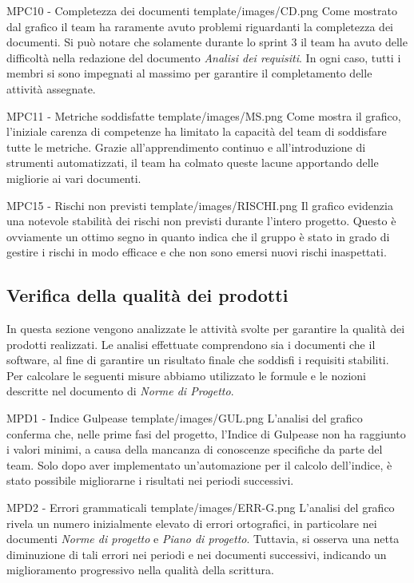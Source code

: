 \Met
{ %
    MPC10 - Completezza dei documenti
}
{ %
    template/images/CD.png
}
{ %
    Come mostrato dal grafico il team ha raramente avuto problemi riguardanti la completezza dei documenti.
    Si può notare che solamente durante lo sprint 3 il team ha avuto delle difficoltà nella redazione del documento \textit{Analisi dei requisiti}.
    In ogni caso, tutti i membri si sono impegnati al massimo per garantire il completamento delle attività assegnate.
}

\Met
{ %
    MPC11 - Metriche soddisfatte
}
{ %
    template/images/MS.png
}
{ %
    Come mostra il grafico, l'iniziale carenza di competenze ha limitato la capacità del team di soddisfare tutte le metriche.
    Grazie all'apprendimento continuo e all'introduzione di strumenti automatizzati, il team ha colmato queste lacune apportando delle migliorie ai vari documenti.
}

\Met
{ %
    MPC15 - Rischi non previsti
}
{ %
    template/images/RISCHI.png
}
{ %
    Il grafico evidenzia una notevole stabilità dei rischi non previsti durante l'intero progetto.
    Questo è ovviamente un ottimo segno in quanto indica che il gruppo è stato in grado di gestire i rischi in modo efficace e che non sono 
    emersi nuovi rischi inaspettati.
}

\subsection{Verifica della qualità dei prodotti}
In questa sezione vengono analizzate le attività svolte per garantire la qualità dei prodotti realizzati.
 Le analisi effettuate comprendono sia i documenti che il software, al fine di garantire un risultato finale che soddisfi i requisiti stabiliti.\\
Per calcolare le seguenti misure abbiamo utilizzato le formule e le nozioni descritte nel documento di \textit{Norme di Progetto}.

\Met
{ %
    MPD1 - Indice Gulpease
}
{ %
    template/images/GUL.png
}
{ %
    L'analisi del grafico conferma che, nelle prime fasi del progetto, l'Indice di Gulpease non ha raggiunto i valori minimi, a causa della mancanza di conoscenze specifiche da parte del team.
    Solo dopo aver implementato un'automazione per il calcolo dell'indice, è stato possibile migliorarne i risultati nei periodi successivi.
}

\Met
{ %
    MPD2 - Errori grammaticali
}
{ %
    template/images/ERR-G.png
}
{ %
    L'analisi del grafico rivela un numero inizialmente elevato di errori ortografici, in particolare nei documenti \textit{Norme di progetto} e \textit{Piano di progetto}.
    Tuttavia, si osserva una netta diminuzione di tali errori nei periodi e nei documenti successivi, indicando un miglioramento progressivo nella qualità della scrittura.
}



